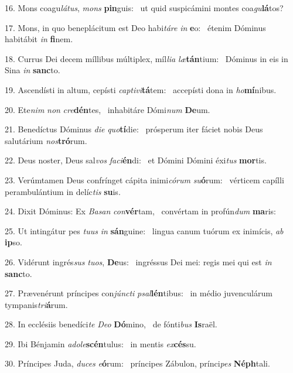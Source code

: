 16. Mons coagu\textit{lá}\textit{tus}, \textit{mons} \textbf{pin}guis: \ast\  ut quid suspicámini montes coa\textit{gu}\textbf{lá}tos?\

17. Mons, in quo beneplácitum est Deo habi\textit{tá}\textit{re} \textit{in} \textbf{e}o: \ast\  étenim Dóminus habitábit \textit{in} \textbf{fi}nem.\

18. Currus Dei decem míllibus múltiplex, míl\textit{li}\textit{a} \textit{læ}\textbf{tán}tium: \ast\  Dóminus in eis in Sina \textit{in} \textbf{sanc}to.\

19. Ascendísti in altum, cepísti \textit{cap}\textit{ti}\textit{vi}\textbf{tá}tem: \ast\  accepísti dona in \textit{ho}\textbf{mí}nibus.\

20. Ete\textit{nim} \textit{non} \textit{cre}\textbf{dén}tes, \ast\  inhabitáre Dómi\textit{num} \textbf{De}um.\

21. Benedíctus Dóminus \textit{di}\textit{e} \textit{quo}\textbf{tí}die: \ast\  prósperum iter fáciet nobis Deus salutárium \textit{nos}\textbf{tró}rum.\

22. Deus noster, Deus sal\textit{vos} \textit{fa}\textit{ci}\textbf{én}di: \ast\  et Dómini Dómini éxi\textit{tus} \textbf{mor}tis.\

23. Verúmtamen Deus confrínget cápita inimi\textit{có}\textit{rum} \textit{su}\textbf{ó}rum: \ast\  vérticem capílli perambulántium in delíc\textit{tis} \textbf{su}is.\

24. Dixit Dóminus: Ex \textit{Ba}\textit{san} \textit{con}\textbf{vér}tam, \ast\  convértam in profún\textit{dum} \textbf{ma}ris:\

25. Ut intingátur pes \textit{tu}\textit{us} \textit{in} \textbf{sán}guine: \ast\  lingua canum tuórum ex inimícis, \textit{ab} \textbf{ip}so.\

26. Vidérunt ingrés\textit{sus} \textit{tu}\textit{os}, \textbf{De}us: \ast\  ingréssus Dei mei: regis mei qui est \textit{in} \textbf{sanc}to.\

27. Prævenérunt príncipes con\textit{júnc}\textit{ti} \textit{psal}\textbf{lén}tibus: \ast\  in médio juvenculárum tympanis\textit{tri}\textbf{á}rum.\

28. In ecclésiis benedíci\textit{te} \textit{De}\textit{o} \textbf{Dó}mino, \ast\  de fónti\textit{bus} \textbf{Is}raël.\

29. Ibi Bénjamin \textit{ad}\textit{o}\textit{le}\textbf{scén}tulus: \ast\  in mentis \textit{ex}\textbf{cés}su.\

30. Príncipes Juda, \textit{du}\textit{ces} \textit{e}\textbf{ó}rum: \ast\  príncipes Zábulon, prínci\textit{pes} \textbf{Néph}tali.\

